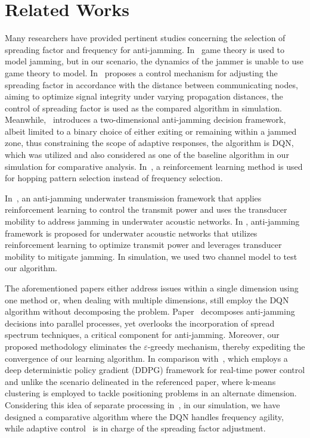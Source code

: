 \section{Related Works}
Many researchers have provided pertinent studies concerning the selection of spreading factor and frequency for anti-jamming. In~\cite{9380308,6117758,9050457} game theory is used to model jamming, but in our scenario, the dynamics of the jammer is unable to use game theory to model. In~\cite{7996380} proposes a control mechanism for adjusting the spreading factor in accordance with the distance between communicating nodes, aiming to optimize signal integrity under varying propagation distances, the control of spreading factor is used as the compared algorithm in simulation. \textcolor[rgb]{0000,0.00,0000}{Meanwhile,~\cite{7952524} introduces a two-dimensional anti-jamming decision framework, albeit limited to a binary choice of either exiting or remaining within a jammed zone, thus constraining the scope of adaptive responses, the algorithm is DQN, which was utilized and also considered as one of the baseline algorithm in our simulation for comparative analysis. In~\cite{10226268}, a reinforcement learning method is used for hopping pattern selection instead of frequency selection.}

In~\cite{8254362}, an anti-jamming underwater transmission framework that applies reinforcement learning to control the transmit power and uses the transducer mobility to address jamming in underwater acoustic networks. In \cite{8254362}, anti-jamming framework is proposed for underwater acoustic networks that utilizes reinforcement learning to optimize transmit power and leverages transducer mobility to mitigate jamming. In simulation, we used two channel model to test our algorithm.

The aforementioned papers either address issues within a single dimension using one method or, when dealing with multiple dimensions, still employ the DQN algorithm without decomposing the problem. Paper~\cite{9751039} decomposes anti-jamming decisions into parallel processes, yet overlooks the incorporation of spread spectrum techniques, a critical component for anti-jamming. Moreover, our proposed methodology eliminates the $\varepsilon$-greedy mechanism, thereby expediting the convergence of our learning algorithm. In comparison with~\cite{9837014}, which employs a deep deterministic policy gradient (DDPG) framework for real-time power control and unlike the scenario delineated in the referenced paper, where k-means~\cite{electronics9081295} clustering is employed to tackle positioning problems in an alternate dimension. Considering this idea of separate processing in~\cite{electronics9081295}, in our simulation, we have designed a comparative algorithm where the DQN handles frequency agility, while adaptive control~\cite{10120634} is in charge of the spreading factor adjustment.